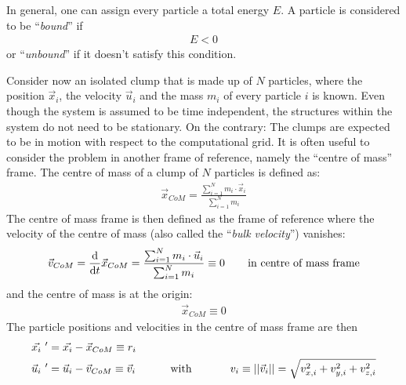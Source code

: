 In general, one can assign every particle a total energy $E$. 
A particle is considered to be ``\emph{bound}'' if
%
\begin{align}
	E < 0 \label{eq:bound}
\end{align}
%
or ``\emph{unbound}'' if it doesn't satisfy this condition.

Consider now an isolated clump that is made up of $N$ particles, where the position $\vec{x}_i$, the velocity $\vec{u}_i$ and the mass $m_i$ of every particle $i$ is known. 
Even though the system is assumed to be time independent, the structures within the system do not need to be stationary.
On the contrary: The clumps are expected to be in motion with respect to the computational grid.
It is often useful to consider the problem in another frame of reference, namely the ``centre of mass'' frame.
The centre of mass of a clump of $N$ particles is defined as:
%
\begin{align}
	\vec{x}_{CoM} = \frac{\sum_{i=1}^{N} m_i \cdot \vec{x}_i}{\sum_{i=1}^{N} m_i} \label{eq:com}
\end{align}
%
The centre of mass frame is then defined as the frame of reference where the velocity of the centre of mass (also called the ``\emph{bulk velocity}'') vanishes:
%
\begin{align}
	\vec{v}_{CoM} = \frac{\mathrm{d}}{\mathrm{d} t} \vec{x}_{CoM}  = \frac{\sum_{i=1}^{N} m_i \cdot \vec{u}_i}{\sum_{i=1}^{N} m_i} \equiv 0 \text{ \hspace{5mm} in centre of mass frame} \label{eq:vcom}
\end{align}
%
and the centre of mass is at the origin:
%
\begin{align}
	\vec{x}_{CoM} \equiv 0
\end{align}
%
The particle positions and velocities in the centre of mass frame are then
%
\begin{align}
	\vec{x_i}\ ' &= \vec{x_i} -\vec{x}_{CoM} \equiv r_i\\
	\vec{u}_{i}\ ' & = \vec{u}_i - \vec{v}_{CoM} \equiv \vec{v}_i \text{\hspace{1cm} with \hspace{1cm} }  v_i \equiv ||\vec{v}_i|| = \sqrt{v_{x,i}^2 + v_{y,i}^2 + v_{z,i}^2}
\end{align}
%

